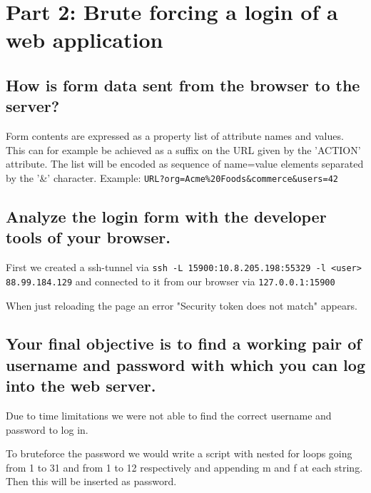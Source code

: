 \section{Part 2: Brute forcing a login of a web application}

\subsection{How is form data sent from the browser to the server?}

Form contents are expressed as a property list of attribute names and values. This can for example be achieved as a suffix on the URL given by the 'ACTION' attribute. The list will be encoded as sequence of name=value elements separated by the '\&' character. Example: \verb|URL?org=Acme%20Foods&commerce&users=42|



\subsection{Analyze the login form with the developer tools of your browser.}

First we created a ssh-tunnel via \verb|ssh -L 15900:10.8.205.198:55329 -l <user> 88.99.184.129| and connected to it from our browser via \verb|127.0.0.1:15900|

When just reloading the page an error "Security token does not match" appears.



\subsection{Your final objective is to find a working pair of username and password with which you can log into the web server.}

Due to time limitations we were not able to find the correct username and password to log in.

To bruteforce the password we would write a script with nested for loops going from 1 to 31 and from 1 to 12 respectively and appending m and f at each string.
Then this will be inserted as password.